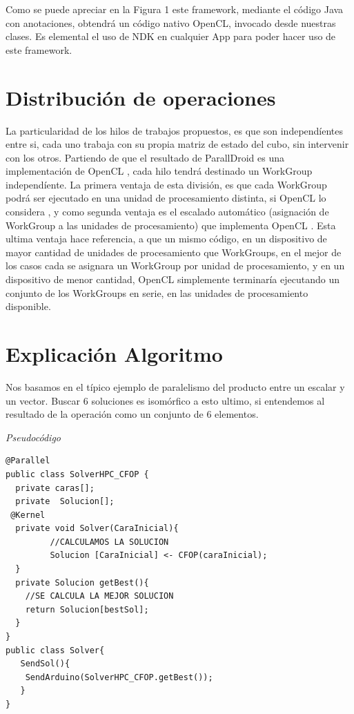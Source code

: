 \documentclass[runningheads,a4paper]{llncs}
\begin{document}
Como se puede apreciar en la Figura 1 este framework, mediante el código Java con anotaciones, obtendrá un código nativo OpenCL, invocado desde nuestras clases. Es elemental el uso de NDK en cualquier App para poder hacer uso de este framework.

\section{Distribución de operaciones}
La particularidad de los hilos de trabajos propuestos, es que son independíentes entre si, cada uno trabaja con su propia matriz de estado del cubo, sin intervenir con los otros. Partiendo de que el resultado de ParallDroid es una implementación de OpenCL \cite{jour}, cada hilo tendrá destinado un WorkGroup independíente. La primera ventaja de esta división, es que cada WorkGroup podrá ser ejecutado en una unidad de procesamiento distinta, si OpenCL lo considera \cite{OpenCLbook}, y como segunda ventaja es el escalado automático (asignación de WorkGroup a las unidades de procesamiento) que implementa OpenCL \cite{OpenCLbook}. Esta ultima ventaja hace referencia, a que un mismo código, en un dispositivo de mayor cantidad de unidades de procesamiento que WorkGroups, en el mejor de los casos cada  se asignara un WorkGroup por unidad de procesamiento, y en un dispositivo de menor cantidad,  OpenCL simplemente terminaría ejecutando un conjunto de los WorkGroups en serie, en las unidades de procesamiento disponible.


\section{Explicación Algoritmo}

Nos basamos en el típico ejemplo de paralelismo del producto entre un escalar y un vector. Buscar 6 soluciones es isomórfico a esto 
ultimo, si entendemos al resultado de la operación como un conjunto de 6 elementos. 

\medskip
\noindent
{\it Pseudocódigo}
\begin{verbatim}
@Parallel
public class SolverHPC_CFOP {
  private caras[];
  private  Solucion[];
 @Kernel
  private void Solver(CaraInicial){
         //CALCULAMOS LA SOLUCION
         Solucion [CaraInicial] <- CFOP(caraInicial);
  }
  private Solucion getBest(){
 	//SE CALCULA LA MEJOR SOLUCION
 	return Solucion[bestSol];
  }
}
public class Solver{
   SendSol(){
   	SendArduino(SolverHPC_CFOP.getBest());
   }
}
\end{verbatim}
%
\noindent
\end{document}
